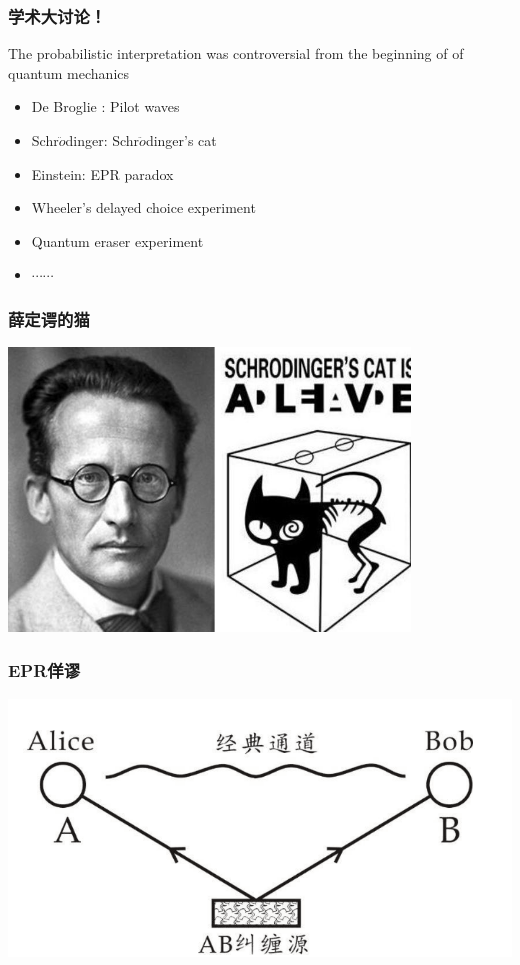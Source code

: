 \begin{frame}
    \frametitle{学术大讨论！}
    The probabilistic interpretation was controversial from the beginning of of quantum mechanics
    \begin{tcolorbox4}
    \begin{itemize}
        \item De Broglie : Pilot waves
        \item Schr$\ddot{o}$dinger: Schr$\ddot{o}$dinger's cat
        \item Einstein: EPR paradox
        \item Wheeler's delayed choice experiment
        \item Quantum eraser experiment
        \item $\cdots \cdots$
    \end{itemize}
    \end{tcolorbox4}
\end{frame}

\begin{frame}
    \frametitle{薛定谔的猫}
    \begin{center}
        \includegraphics[width=0.8\textwidth]{figs/cat.jpeg} \\
    \end{center} 
\end{frame}

\begin{frame}
    \frametitle{EPR佯谬}
    \begin{center}
        \includegraphics[width=1.0\textwidth]{figs/2022-01-09-14-45-26.png} \\
    \end{center} 
\end{frame}

